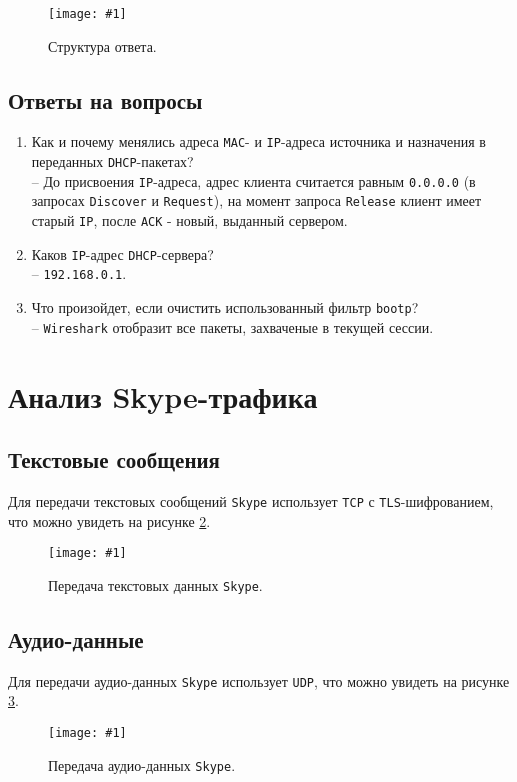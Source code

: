 \documentclass[12pt, a4paper]{article}
\newcommand{\figc}[4]{
  \begin{figure}[H]
  \begin{center}
    \texttt{[image: \#1]}
    \caption{#2}
    \label{fig:#3}
  \end{center}
  \end{figure}
}
\begin{document}
\figc{dhcp_res}{Структура ответа.}{dh_rs}{2.5}

\subsection{Ответы на вопросы}

\begin{enumerate}
  \item Как и почему менялись адреса \texttt{MAC}- и \texttt{IP}-адреса
    источника и назначения в переданных \texttt{DHCP}-пакетах?\\
    -- До присвоения \texttt{IP}-адреса, адрес клиента считается равным
    \texttt{0.0.0.0} (в запросах \texttt{Discover} и \texttt{Request}),
    на момент запроса \texttt{Release} клиент имеет старый \texttt{IP}, после
    \texttt{ACK} - новый, выданный сервером.
  \item Каков \texttt{IP}-адрес \texttt{DHCP}-сервера?\\
    -- \texttt{192.168.0.1}.
  \item Что произойдет, если очистить использованный фильтр \texttt{bootp}?\\
    -- \texttt{Wireshark} отобразит все пакеты, захваченые в текущей сессии.
\end{enumerate}

\section{Анализ Skype-трафика}

\subsection{Текстовые сообщения}

Для передачи текстовых сообщений \texttt{Skype} использует \texttt{TCP} с
\texttt{TLS}-шифрованием, что можно увидеть на рисунке \ref{fig:sk_tx}.

\figc{skype_text}{Передача текстовых данных \texttt{Skype}.}{sk_tx}{2.5}

\subsection{Аудио-данные}

Для передачи аудио-данных \texttt{Skype} использует \texttt{UDP}, что можно
увидеть на рисунке \ref{fig:sk_au}.

\figc{skype_audio}{Передача аудио-данных \texttt{Skype}.}{sk_au}{2.5}
\end{document}
